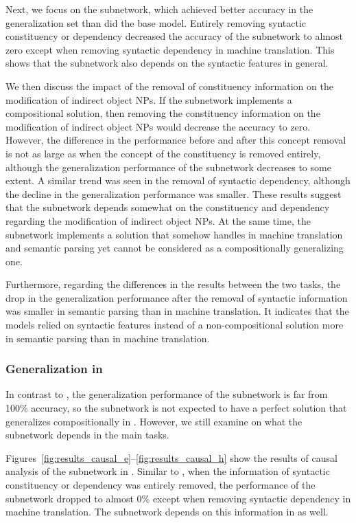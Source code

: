 Next, we focus on the subnetwork, which achieved better accuracy in the generalization set than did the base model.
Entirely removing syntactic constituency or dependency decreased the accuracy of the subnetwork to almost zero except when removing syntactic dependency in machine translation.
This shows that the subnetwork also depends on the syntactic features in general.

We then discuss the impact of the removal of constituency information on the modification of indirect object NPs.
If the subnetwork implements a compositional solution, then removing the constituency information on the modification of indirect object NPs would decrease the accuracy to zero.
However, the difference in the performance before and after this concept removal is not as large as when the concept of the constituency is removed entirely, although the generalization performance of the subnetwork decreases to some extent.
A similar trend was seen in the removal of syntactic dependency, although the decline in the generalization performance was smaller.
These results suggest that the subnetwork depends somewhat on the constituency and dependency regarding the modification of indirect object NPs.
At the same time, the subnetwork implements a solution that somehow handles \dobjppiobjpp{} in machine translation and semantic parsing yet cannot be considered as a compositionally generalizing one.

Furthermore, regarding the differences in the results between the two tasks, the drop in the generalization performance after the removal of syntactic information was smaller in semantic parsing than in machine translation.
It indicates that the models relied on syntactic features instead of a non-compositional solution more in semantic parsing than in machine translation.


\subsubsection{Generalization in \dobjppsubjpp{}}
In contrast to \dobjppiobjpp{}, the generalization performance of the subnetwork is far from 100\% accuracy, so the subnetwork is not expected to have a perfect solution that generalizes compositionally in \dobjppsubjpp{}.
However, we still examine on what the subnetwork depends in the main tasks.

Figures~\ref{fig:results_causal_e}--\ref{fig:results_causal_h} show the results of causal analysis of the subnetwork in \dobjppsubjpp{}.
Similar to \dobjppiobjpp{}, when the information of syntactic constituency or dependency was entirely removed, the performance of the subnetwork dropped to almost 0\% except when removing syntactic dependency in machine translation.
The subnetwork depends on this information in \dobjppsubjpp{} as well.

